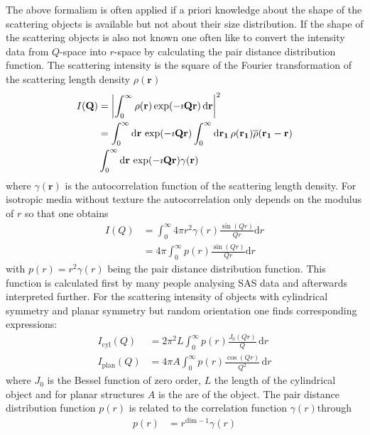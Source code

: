 The above formalism is often applied if a priori knowledge about the shape of the scattering objects is available but not about their size distribution. If the shape of the scattering objects is also not known one often like to convert the intensity data from $Q$-space into $r$-space by calculating the pair distance distribution function. The scattering intensity is the square of the Fourier transformation of the scattering length density $\rho(\mathbf{r})$
\begin{align}
I(\mathbf{Q}) &= {\left\vert\int_0^\infty \rho(\mathbf{r}) \exp(-\imath \mathbf{Q r}) \, \mathrm{d}\mathbf{r}\right\vert}^2  \\
              &= \int_0^\infty \mathrm{d}\mathbf{r} \,  \exp(-\imath \mathbf{Q r}) \int_0^\infty \mathrm{d}\mathbf{r_1}\, \rho(\mathbf{r_1}) \overline{\rho}(\mathbf{r_1}-\mathbf{r}) \\
              & \int_0^\infty \mathrm{d}\mathbf{r} \,\exp(-\imath \mathbf{Q r}) \gamma(\mathbf{r})
\end{align}
where $\gamma(\mathbf{r})$ is the autocorrelation function of the scattering length density. For isotropic media without texture the autocorrelation only depends on the modulus of $r$ so that one obtains
\begin{align}
I(Q) &= \int_0^\infty 4\pi r^2 \gamma(r) \frac{\sin(Qr)}{Qr} \mathrm{d}r\\
     &= 4\pi \int_0^\infty p(r) \frac{\sin(Qr)}{Qr} \mathrm{d}r \label{eq:Isp}
\end{align}
with $p(r)= r^2 \gamma(r)$ being the pair distance distribution function. This function is calculated first by many people analysing SAS data and afterwards interpreted further. For the scattering intensity of objects with cylindrical symmetry and planar symmetry but random orientation one finds corresponding expressions:
\begin{align}
I_\mathrm{cyl}(Q) &= 2\pi^2 L \int_0^\infty p(r) \frac{J_0(Qr)}{Q} \, \mathrm{d}r \label{eq:Icyl} \\
I_\mathrm{plan}(Q) &= 4\pi A \int_0^\infty p(r) \frac{\cos(Qr)}{Q^2} \, \mathrm{d}r \label{eq:Ipl}
\end{align}
where $J_0$ is the Bessel function of zero order, $L$ the length of the cylindrical object and for planar structures $A$ is the are of the object. The pair distance distribution function $p(r)$ is related to the correlation function $\gamma(r)$through
\begin{align}
p(r) &= r^{\mathrm{dim}-1} \gamma(r)
\end{align}
